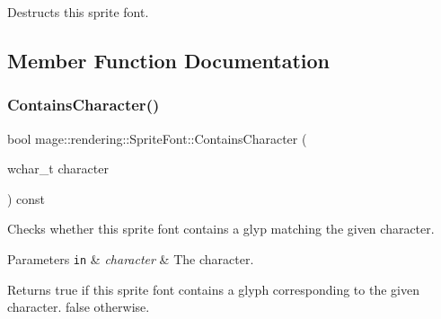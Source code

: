 Destructs this sprite font. 

\subsection{Member Function Documentation}
\mbox{\label{classmage_1_1rendering_1_1_sprite_font_a6f9adb6806acc990ac3feaa547f7f296}} 
\subsubsection{\texorpdfstring{Contains\+Character()}{ContainsCharacter()}}
{\footnotesize\ttfamily bool mage\+::rendering\+::\+Sprite\+Font\+::\+Contains\+Character (\begin{DoxyParamCaption}\item[{wchar\+\_\+t}]{character }\end{DoxyParamCaption}) const}

Checks whether this sprite font contains a glyp matching the given character.


\begin{DoxyParams}[1]{Parameters}
\mbox{\tt in}  & {\em character} & The character. \\
\hline
\end{DoxyParams}
\begin{DoxyReturn}{Returns}
{\ttfamily true} if this sprite font contains a glyph corresponding to the given character. {\ttfamily false} otherwise. 
\end{DoxyReturn}
\mbox{\label{classmage_1_1rendering_1_1_sprite_font_a66fb9548c89d55647101a304ca8a02ac}} 
